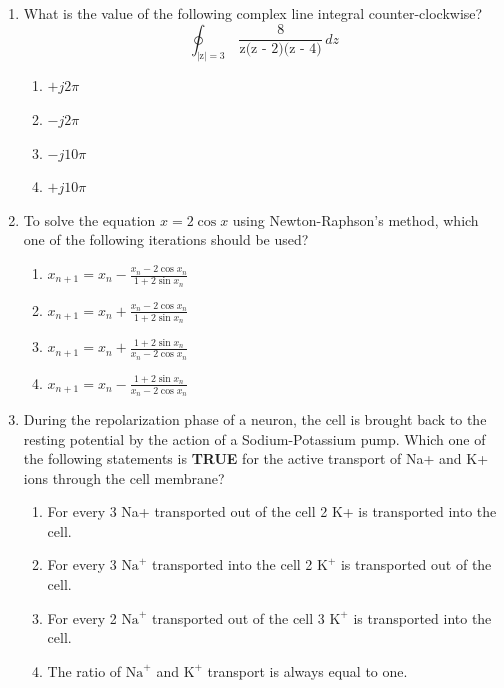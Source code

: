 \documentclass[a4paper,12pt]{exam}
\numberwithin{equation}{enumi}
\numberwithin{figure}{enumi}
\begin{document}
\begin{enumerate}
\item What is the value of the following complex line integral counter-clockwise? \\
\[
\displaystyle\oint_{|\text{z}| = 3} \,\frac{8}{\text{z(z - 2)(z - 4)}} \, dz
\]

\hfill{}

\begin{multicols}{4}
\begin{enumerate}
 \item $+j2\pi$
\item $-j2\pi$
\item $-j10\pi$
\item $+j10\pi$
\end{enumerate}  
\end{multicols}


\item To solve the equation $x = 2 \cos x$ using Newton-Raphson's method, which one of the following iterations should be used? 

\hfill{}

\begin{enumerate}
\item $\displaystyle x_{n+1} = x_n - \frac{x_n - 2\cos x_n}{1 + 2\sin x_n}$
\vspace{0.5cm}
\item $\displaystyle x_{n+1} = x_n + \frac{x_n - 2\cos x_n}{1 + 2\sin x_n}$
\vspace{0.5cm}
\item $\displaystyle x_{n+1} = x_n + \frac{1 + 2\sin x_n}{x_n - 2\cos x_n}$
\vspace{0.5cm}
\item $\displaystyle x_{n+1} = x_n - \frac{1 + 2\sin x_n}{x_n - 2\cos x_n}$
\end{enumerate}  

\vspace{0.25cm}

\item During the repolarization phase of a neuron, the cell is brought back to the resting potential by the action of a Sodium-Potassium pump. Which one of the following  statements is \textbf{TRUE} for the active transport of Na+ and K+ ions through the cell membrane?

\hfill{}

\begin{enumerate}
 \item For every 3 Na+ transported out of the cell 2 K+ is transported into the cell.
\item For every 3 $\text{Na}^+$ transported into the cell 2 $\text{K}^+$ is transported out of the cell.
\item For every 2 $\text{Na}^+$ transported out of the cell 3 $\text{K}^+$ is transported into the cell. 
\item The ratio of $\text{Na}^+$ and $\text{K}^+$ transport is always equal to one.
\end{enumerate}  


\end{enumerate}
\end{document}
